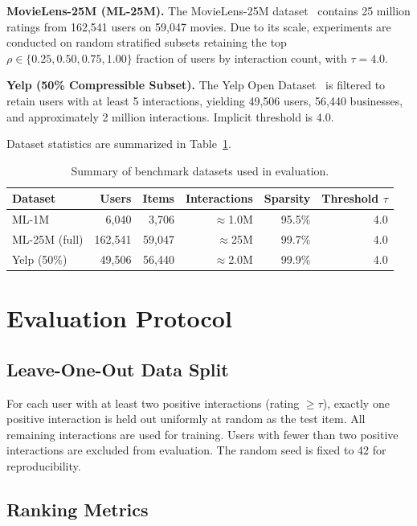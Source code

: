 \textbf{MovieLens-25M (ML-25M).} The MovieLens-25M dataset~\cite{movielens25m} contains 25 million ratings from 162,541 users on 59,047 movies. Due to its scale, experiments are conducted on random stratified subsets retaining the top $\rho \in \{0.25, 0.50, 0.75, 1.00\}$ fraction of users by interaction count, with $\tau = 4.0$.

\textbf{Yelp (50\% Compressible Subset).} The Yelp Open Dataset~\cite{yelp_dataset} is filtered to retain users with at least 5 interactions, yielding 49,506 users, 56,440 businesses, and approximately 2 million interactions. Implicit threshold is 4.0.

Dataset statistics are summarized in Table~\ref{tab:datasets}.

\begin{table}[h!]
\centering
\caption{Summary of benchmark datasets used in evaluation.}
\label{tab:datasets}
\begin{tabular}{@{}lrrrrr@{}}
\toprule
\textbf{Dataset} & \textbf{Users} & \textbf{Items} & \textbf{Interactions} & \textbf{Sparsity} & \textbf{Threshold $\tau$} \\
\midrule
ML-1M         & 6,040   & 3,706  & $\approx$1.0M  & 95.5\% & 4.0 \\
ML-25M (full) & 162,541 & 59,047 & $\approx$25M   & 99.7\% & 4.0 \\
Yelp (50\%)   & 49,506  & 56,440 & $\approx$2.0M  & 99.9\% & 4.0 \\
\bottomrule
\end{tabular}
\end{table}

\section{Evaluation Protocol}
\label{sec:eval}

\subsection{Leave-One-Out Data Split}

For each user with at least two positive interactions (rating $\ge \tau$), exactly one positive interaction is held out uniformly at random as the test item. All remaining interactions are used for training. Users with fewer than two positive interactions are excluded from evaluation. The random seed is fixed to 42 for reproducibility.

\subsection{Ranking Metrics}

